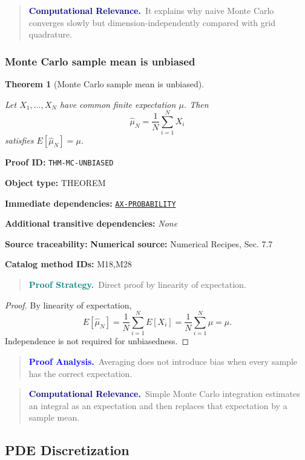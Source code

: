 \documentclass[10pt]{article}
\newcommand{\pidraw}[1]{\begingroup\urlstyle{tt}\nolinkurl{#1}\endgroup}
\newcommand{\pidref}[1]{\hyperref[prf:#1]{\pidraw{#1}}}
\newtheorem{theorem}{Theorem}[section]
\theoremstyle{definition}
\theoremstyle{remark}
\newenvironment{proofstrategy}
{\begin{quote}\small\noindent\textbf{\textcolor{teal}{Proof Strategy.}}\ }
{\end{quote}}
\newenvironment{proofanalysis}
{\begin{quote}\small\noindent\textbf{\textcolor{blue}{Proof Analysis.}}\ }
{\end{quote}}
\newenvironment{computationalrelevance}
{\begin{quote}\small\noindent\textbf{\textcolor{navy}{Computational Relevance.}}\ }
{\end{quote}}
\newcommand{\meta}[2]{\noindent\textbf{#1:} #2\par}
\begin{document}
\begin{computationalrelevance}It explains why naive Monte Carlo converges slowly but dimension-independently compared with grid quadrature.\end{computationalrelevance}

\subsubsection{Monte Carlo sample mean is unbiased}

\begin{theorem}[Monte Carlo sample mean is unbiased]\label{prf:THM-MC-UNBIASED}

Let $X_1,\ldots,X_N$ have common finite expectation $\mu$. Then
\[
\widehat\mu_N=\frac1N\sum_{i=1}^N X_i
\]
satisfies $E[\widehat\mu_N]=\mu$.

\end{theorem}

\meta{Proof ID}{\pidraw{THM-MC-UNBIASED}}
\meta{Object type}{THEOREM}
\meta{Immediate dependencies}{\pidref{AX-PROBABILITY}}
\meta{Additional transitive dependencies}{\emph{None}}
\meta{Source traceability}{\textbf{Numerical source:} Numerical Recipes, Sec. 7.7}
\meta{Catalog method IDs}{M18,M28}

\begin{proofstrategy}Direct proof by linearity of expectation.\end{proofstrategy}

\begin{proof}

By linearity of expectation,
\[
E[\widehat\mu_N]
=
\frac1N\sum_{i=1}^N E[X_i]
=
\frac1N\sum_{i=1}^N\mu
=
\mu.
\]
Independence is not required for unbiasedness.

\end{proof}

\begin{proofanalysis}Averaging does not introduce bias when every sample has the correct expectation.\end{proofanalysis}

\begin{computationalrelevance}Simple Monte Carlo integration estimates an integral as an expectation and then replaces that expectation by a sample mean.\end{computationalrelevance}

\subsection{PDE Discretization}
\end{document}
